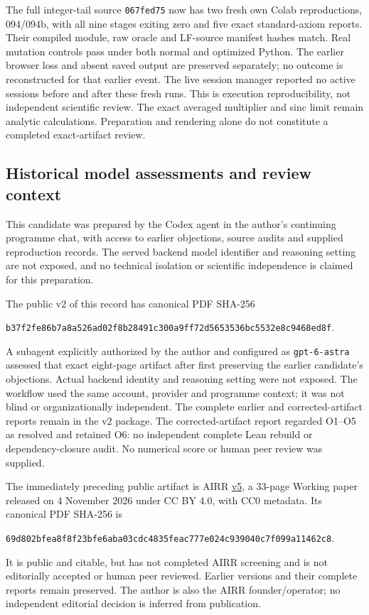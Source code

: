 \documentclass[11pt]{article}
\begin{document}
The full integer-tail source \texttt{067fed75} now has two fresh own Colab
reproductions, 094/094b, with all nine stages exiting zero and five exact
standard-axiom reports. Their compiled module, raw oracle and LF-source
manifest hashes match. Real mutation controls pass under both normal and
optimized Python. The earlier browser loss and absent saved output are
preserved separately; no outcome is reconstructed for that earlier event.
The live session manager reported no active sessions before and after these
fresh runs. This is execution reproducibility, not independent scientific
review. The exact averaged multiplier and sinc limit remain analytic
calculations. Preparation and rendering alone do not constitute a completed
exact-artifact review.
\bigskip
\subsection*{Historical model assessments and review context}
This candidate was prepared by the Codex agent in the author's continuing
programme chat, with access to earlier objections, source audits and supplied
reproduction records. The served backend model identifier and reasoning
setting are not exposed, and no technical isolation or scientific independence
is claimed for this preparation.

The public v2 of this record has canonical PDF SHA-256
\begin{center}\small\texttt{b37f2fe86b7a8a526ad02f8b28491c300a9ff72d5653536bc5532e8c9468ed8f}.\end{center}
A subagent explicitly authorized by the author and configured as
\texttt{gpt-6-astra} assessed that exact eight-page artifact after first
preserving the earlier candidate's objections. Actual backend identity and
reasoning setting were not exposed. The workflow used the same account,
provider and programme context; it was not blind or organizationally
independent. The complete earlier and corrected-artifact reports remain in
the v2 package. The corrected-artifact report regarded O1--O5 as resolved
and retained O6: no independent complete Lean rebuild or dependency-closure
audit. No numerical score or human peer review was supplied.

The immediately preceding public artifact is AIRR
\href{https://airr.science/papers/ARR-2026-7EPM3V3DP796BBRR/versions/v5/}{v5},
a 33-page Working paper released on 4 November 2026 under CC BY 4.0,
with CC0 metadata. Its canonical PDF SHA-256 is
\begin{center}\small\texttt{69d802bfea8f8f23bfe6aba03cdc4835feac777e024c939040c7f099a11462c8}.\end{center}
It is public and citable, but has not completed AIRR screening and is not
editorially accepted or human peer reviewed. Earlier versions and their complete
reports remain preserved. The author is also the AIRR founder/operator; no
independent editorial decision is inferred from publication.
\end{document}
